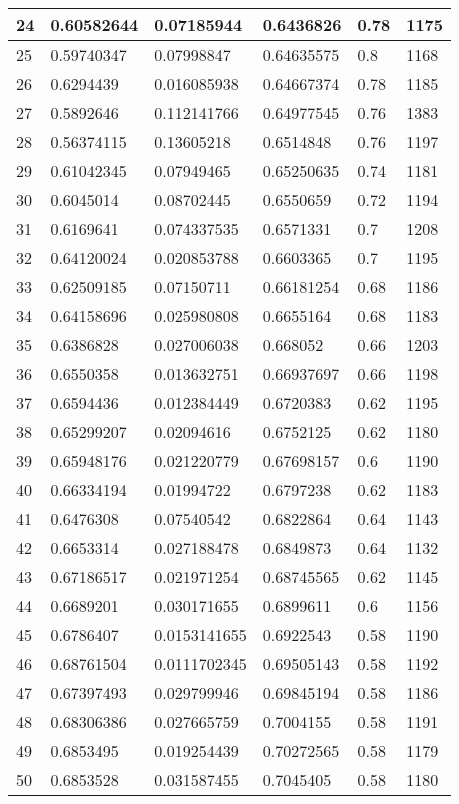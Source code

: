 \begin{longtable}{|l|l|l|l|l|l|}
24 & 0.60582644 & 0.07185944 & 0.6436826 & 0.78 & 1175 \\ \hline 
25 & 0.59740347 & 0.07998847 & 0.64635575 & 0.8 & 1168 \\ \hline 
26 & 0.6294439 & 0.016085938 & 0.64667374 & 0.78 & 1185 \\ \hline 
27 & 0.5892646 & 0.112141766 & 0.64977545 & 0.76 & 1383 \\ \hline 
28 & 0.56374115 & 0.13605218 & 0.6514848 & 0.76 & 1197 \\ \hline 
29 & 0.61042345 & 0.07949465 & 0.65250635 & 0.74 & 1181 \\ \hline 
30 & 0.6045014 & 0.08702445 & 0.6550659 & 0.72 & 1194 \\ \hline 
31 & 0.6169641 & 0.074337535 & 0.6571331 & 0.7 & 1208 \\ \hline 
32 & 0.64120024 & 0.020853788 & 0.6603365 & 0.7 & 1195 \\ \hline 
33 & 0.62509185 & 0.07150711 & 0.66181254 & 0.68 & 1186 \\ \hline 
34 & 0.64158696 & 0.025980808 & 0.6655164 & 0.68 & 1183 \\ \hline 
35 & 0.6386828 & 0.027006038 & 0.668052 & 0.66 & 1203 \\ \hline 
36 & 0.6550358 & 0.013632751 & 0.66937697 & 0.66 & 1198 \\ \hline 
37 & 0.6594436 & 0.012384449 & 0.6720383 & 0.62 & 1195 \\ \hline 
38 & 0.65299207 & 0.02094616 & 0.6752125 & 0.62 & 1180 \\ \hline 
39 & 0.65948176 & 0.021220779 & 0.67698157 & 0.6 & 1190 \\ \hline 
40 & 0.66334194 & 0.01994722 & 0.6797238 & 0.62 & 1183 \\ \hline 
41 & 0.6476308 & 0.07540542 & 0.6822864 & 0.64 & 1143 \\ \hline 
42 & 0.6653314 & 0.027188478 & 0.6849873 & 0.64 & 1132 \\ \hline 
43 & 0.67186517 & 0.021971254 & 0.68745565 & 0.62 & 1145 \\ \hline 
44 & 0.6689201 & 0.030171655 & 0.6899611 & 0.6 & 1156 \\ \hline 
45 & 0.6786407 & 0.0153141655 & 0.6922543 & 0.58 & 1190 \\ \hline 
46 & 0.68761504 & 0.0111702345 & 0.69505143 & 0.58 & 1192 \\ \hline 
47 & 0.67397493 & 0.029799946 & 0.69845194 & 0.58 & 1186 \\ \hline 
48 & 0.68306386 & 0.027665759 & 0.7004155 & 0.58 & 1191 \\ \hline 
49 & 0.6853495 & 0.019254439 & 0.70272565 & 0.58 & 1179 \\ \hline 
50 & 0.6853528 & 0.031587455 & 0.7045405 & 0.58 & 1180 \\ \hline 
\end{longtable}